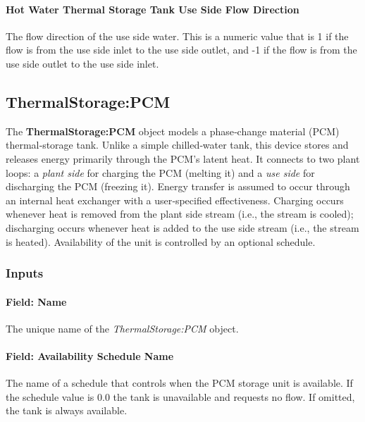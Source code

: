 \paragraph{Hot Water Thermal Storage Tank Use Side Flow Direction}\label{hot-water-thermal-storage-use-side-flow-direction-thermalstoragehotwaterstratified}

The flow direction of the use side water. This is a numeric value that is 1 if
the flow is from the use side inlet to the use side outlet, and -1 if the flow
is from the use side outlet to the use side inlet.

\subsection{ThermalStorage:PCM}\label{thermalstoragepcm}

The \textbf{ThermalStorage:PCM} object models a phase‐change material (PCM) thermal‐storage tank.  Unlike a simple chilled‐water tank, this device stores and releases energy primarily through the PCM’s latent heat.  It connects to two plant loops: a \emph{plant side} for charging the PCM (melting it) and a \emph{use side} for discharging the PCM (freezing it).  Energy transfer is assumed to occur through an internal heat exchanger with a user‑specified effectiveness.  Charging occurs whenever heat is removed from the plant side stream (i.e., the stream is cooled); discharging occurs whenever heat is added to the use side stream (i.e., the stream is heated).  Availability of the unit is controlled by an optional schedule.

\subsubsection{Inputs}\label{inputs-pcmstorage}

\paragraph{Field: Name}\label{field-pcmstorage-name}

The unique name of the \emph{ThermalStorage:PCM} object.

\paragraph{Field: Availability Schedule Name}\label{field-pcmstorage-availability-schedule-name}

The name of a schedule that controls when the PCM storage unit is available.  If the schedule value is 0.0 the tank is unavailable and requests no flow.  If omitted, the tank is always available.

